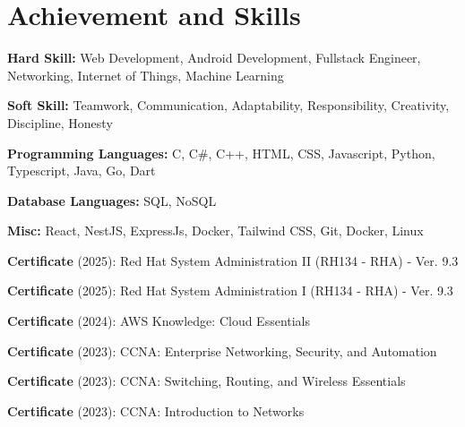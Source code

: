 \documentclass[../main.tex]{subfiles}
\begin{document}
\section{Achievement and Skills}
\begin{highlights}
    \item \textbf{Hard Skill:} Web Development, Android Development, Fullstack Engineer, Networking, Internet of Things, Machine Learning
    \item \textbf{Soft Skill:} Teamwork, Communication, Adaptability, Responsibility, Creativity, Discipline, Honesty
    \item \textbf{Programming Languages:} C, C\#, C++, HTML, CSS, Javascript, Python, Typescript, Java, Go, Dart
    \item \textbf{Database Languages:} SQL, NoSQL
    \item \textbf{Misc:} React, NestJS, ExpressJs, Docker, Tailwind CSS, Git, Docker, Linux
    \item \textbf{Certificate} (2025): Red Hat System Administration II (RH134 - RHA) - Ver. 9.3
    \item \textbf{Certificate} (2025): Red Hat System Administration I (RH134 - RHA) - Ver. 9.3
    \item \textbf{Certificate} (2024): AWS Knowledge: Cloud Essentials
    \item \textbf{Certificate} (2023): CCNA: Enterprise Networking, Security, and Automation
    \item \textbf{Certificate} (2023): CCNA: Switching, Routing, and Wireless Essentials
    \item \textbf{Certificate} (2023): CCNA: Introduction to Networks
\end{highlights}
\end{document}
